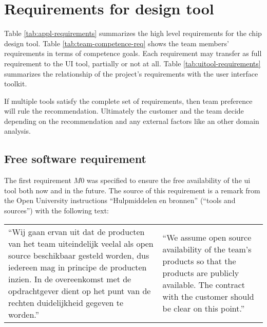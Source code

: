 \section{Requirements for design tool}

Table \ref{tab:appl-requirements} summarizes the high level requirements for
the chip design tool. Table \ref{tab:team-competence-req} shows the team
members' requirements in terms of competence goals. Each requirement may
transfer as full requirement to the UI tool, partially or not at all. Table
\ref{tab:uitool-requirements} summarizes the relationship of the project's
requirements with the user interface toolkit.

If multiple tools satisfy the complete set of requirements, then
team preference will rule the recommendation. Ultimately the customer
and the team decide depending on the recommendation and any external factors
like an other domain analysis.

\subsection{Free software requirement}

The first requirement $M0$ was specified to ensure the free availability of the
ui tool both now and in the future. The source of
this requirement is a remark from the Open University instructions
``Hulpmiddelen en bronnen'' (``tools and sources'') with the following text:

\vspace{1em}

\begin{tabular}[t]{ll}
\begin{minipage}{.45\textwidth}

	``Wij gaan ervan uit dat de producten van het team uiteindelijk veelal als
	open source beschikbaar gesteld worden, dus iedereen mag in principe de
	producten inzien. In de overeenkomst met de opdrachtgever dient op het punt
	van de rechten duidelijkheid gegeven te worden.''

\end{minipage}

&

\begin{minipage}{.45\textwidth}

	``We assume open source availability of the team's products so that the
	products are publicly available. The contract with the customer should be
	clear on this point.''

\end{minipage}

\end{tabular}

